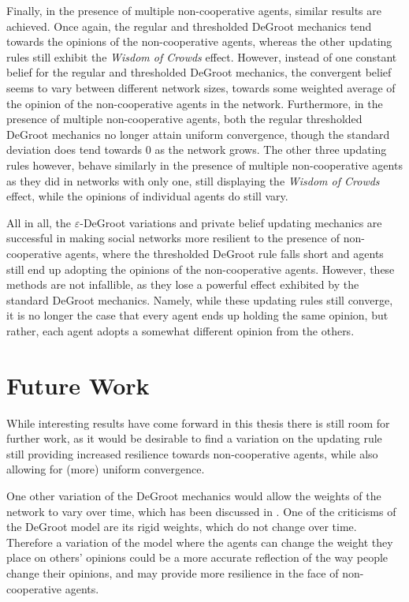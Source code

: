 \documentclass[a4paper, 12pt]{report}
\begin{document}
\noindent Finally, in the presence of multiple non-cooperative agents, similar results are achieved. Once again, the regular and thresholded DeGroot mechanics tend towards the opinions of the non-cooperative agents, whereas the other updating rules still exhibit the \emph{Wisdom of Crowds} effect. However, instead of one constant belief for the regular and thresholded DeGroot mechanics, the convergent belief seems to vary between different network sizes, towards some weighted average of the opinion of the non-cooperative agents in the network. Furthermore, in the presence of multiple non-cooperative agents, both the regular thresholded DeGroot mechanics no longer attain uniform convergence, though the standard deviation does tend towards $0$ as the network grows. The other three updating rules however, behave similarly in the presence of multiple non-cooperative agents as they did in networks with only one, still displaying the \emph{Wisdom of Crowds} effect, while the opinions of individual agents do still vary.

\noindent All in all, the $\varepsilon$-DeGroot variations and private belief updating mechanics are successful in making social networks more resilient to the presence of non-cooperative agents, where the thresholded DeGroot rule falls short and agents still end up adopting the opinions of the non-cooperative agents. However, these methods are not infallible, as they lose a powerful effect exhibited by the standard DeGroot mechanics. Namely, while these updating rules still converge, it is no longer the case that every agent ends up holding the same opinion, but rather, each agent adopts a somewhat different opinion from the others.

\chapter{Future Work}

While interesting results have come forward in this thesis there is still room for further work, as it would be desirable to find a variation on the updating rule still providing increased resilience towards non-cooperative agents, while also allowing for (more) uniform convergence.

\noindent One other variation of the DeGroot mechanics would allow the weights of the network to vary over time, which has been discussed in \parencite{chatterjee1977stochastic}. One of the criticisms of the DeGroot model are its rigid weights, which do not change over time. Therefore a variation of the model where the agents can change the weight they place on others' opinions could be a more accurate reflection of the way people change their opinions, and may provide more resilience in the face of non-cooperative agents.
\end{document}
